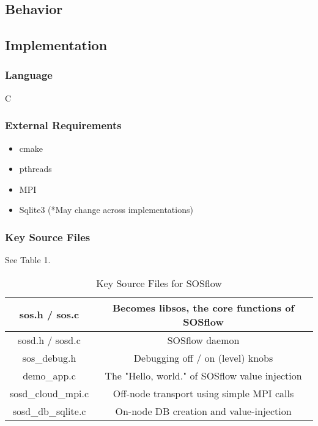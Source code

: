\subsection{Behavior}
\subsection{Implementation}
\subsubsection{Language}C
\subsubsection{External Requirements}
\begin{itemize}
    \item cmake
    \item pthreads
    \item MPI
    \item Sqlite3 (*May change across implementations)
\end{itemize}
\subsubsection{Key Source Files}
See Table 1.

\begin{table}[!t]
\renewcommand{\arraystretch}{1.3}
\caption{Key Source Files for SOSflow}
\label{table_example}
\centering
\begin{tabular}{|c|c|}
\hline
sos.h / sos.c & Becomes libsos, the core functions of SOSflow\\
\hline
sosd.h / sosd.c & SOSflow daemon\\
\hline
sos\_debug.h & Debugging off / on (level) knobs\\
\hline
demo\_app.c & The "Hello, world." of SOSflow value injection\\
\hline
sosd\_cloud\_mpi.c & Off-node transport using simple MPI calls\\
\hline
sosd\_db\_sqlite.c & On-node DB creation and value-injection\\
\hline
\end{tabular}
\end{table}

